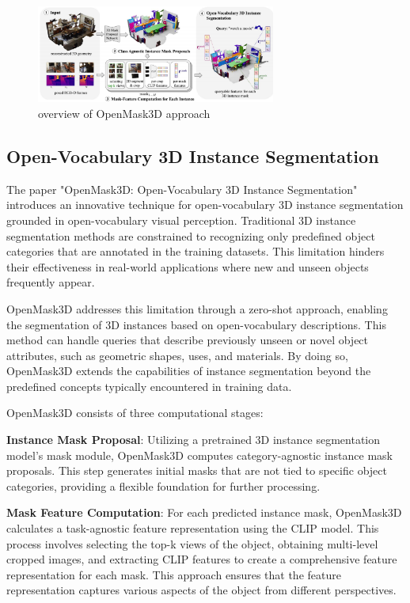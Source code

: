 \begin{figure}[h]
  \centering
  \includegraphics[width=0.7\textwidth]{img/openmark.png}
  \caption{overview of OpenMask3D approach}
\end{figure}

\subsection{Open-Vocabulary 3D Instance Segmentation}

The paper "OpenMask3D: Open-Vocabulary 3D Instance Segmentation" introduces an innovative technique for open-vocabulary 3D instance segmentation grounded in open-vocabulary visual perception. Traditional 3D instance segmentation methods are constrained to recognizing only predefined object categories that are annotated in the training datasets. This limitation hinders their effectiveness in real-world applications where new and unseen objects frequently appear.

OpenMask3D addresses this limitation through a zero-shot approach, enabling the segmentation of 3D instances based on open-vocabulary descriptions. This method can handle queries that describe previously unseen or novel object attributes, such as geometric shapes, uses, and materials. By doing so, OpenMask3D extends the capabilities of instance segmentation beyond the predefined concepts typically encountered in training data.



OpenMask3D consists of three computational stages:

\textbf{Instance Mask Proposal}: Utilizing a pretrained 3D instance segmentation model’s mask module, OpenMask3D computes category-agnostic instance mask proposals. This step generates initial masks that are not tied to specific object categories, providing a flexible foundation for further processing.

\textbf{Mask Feature Computation}: For each predicted instance mask, OpenMask3D calculates a task-agnostic feature representation using the CLIP model. This process involves selecting the top-k views of the object, obtaining multi-level cropped images, and extracting CLIP features to create a comprehensive feature representation for each mask. This approach ensures that the feature representation captures various aspects of the object from different perspectives.

